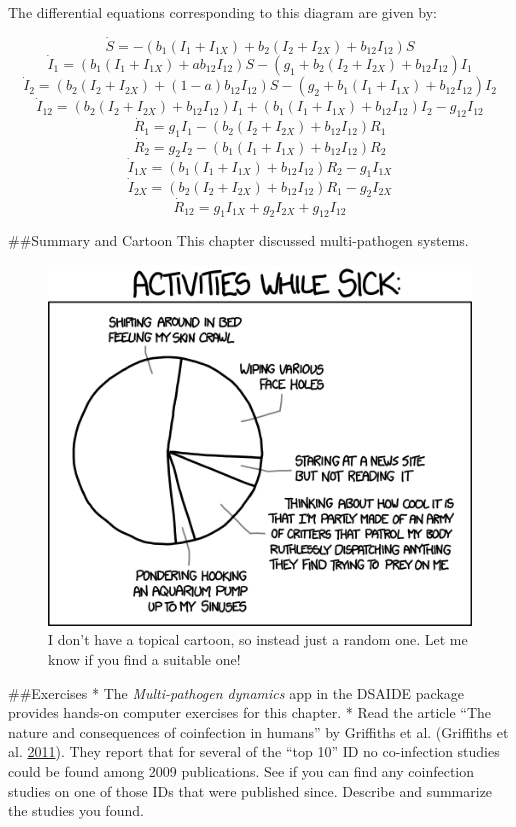 \documentclass[]{book}
\theoremstyle{definition}
\theoremstyle{definition}
\theoremstyle{definition}
\theoremstyle{remark}
\begin{document}
The differential equations corresponding to this diagram are given by:

\[\dot S =  -  (b_{1} (I_1+I_{1X}) + b_{2} (I_2+I_{2X}) + b_{12}I_{12}) S  \]
\[\dot I_1 =   (b_{1} (I_1+I_{1X}) + ab_{12} I_{12})S - (g_1  + b_{2} (I_2+I_{2X})  + b_{12}  I_{12}) I_1\]
\[\dot I_2 =   (b_{2} (I_2+I_{2X}) +  (1-a) b_{12} I_{12})S - (g_2 + b_{1}(I_1 + I_{1X}) + b_{12} I_{12}) I_2\]
\[\dot I_{12} = (b_{2} (I_2+I_{2X})  + b_{12}  I_{12}) I_1 + (b_{1}(I_1 + I_{1X}) + b_{12} I_{12}) I_2  - g_{12} I_{12}\]
\[\dot R_1 = g_1 I_1 - (b_2 (I_2 + I_{2X}) + b_{12}  I_{12}) R_1\]
\[\dot R_2 = g_2 I_2 - (b_1 (I_1 + I_{1X}) + b_{12}  I_{12}) R_2\]
\[\dot I_{1X} = (b_1 (I_1 + I_{1X}) + b_{12}  I_{12}) R_2 - g_{1} I_{1X}\]
\[\dot I_{2X} = (b_2 (I_2 + I_{2X}) + b_{12}  I_{12}) R_1 - g_{2} I_{2X}\]
\[\dot R_{12} = g_{1} I_{1X} + g_{2} I_{2X} + g_{12} I_{12} \]

\#\#Summary and Cartoon This chapter discussed multi-pathogen systems.

\begin{figure}
\centering
\includegraphics{./images/xkcd-sick_day.png}
\caption{I don't have a topical cartoon, so instead just a random one.
Let me know if you find a suitable one!}
\end{figure}

\#\#Exercises * The \emph{Multi-pathogen dynamics} app in the DSAIDE
package provides hands-on computer exercises for this chapter. * Read
the article ``The nature and consequences of coinfection in humans'' by
Griffiths et al. (Griffiths et al.
\protect\hyperlink{ref-griffiths11}{2011}). They report that for several
of the ``top 10'' ID no co-infection studies could be found among 2009
publications. See if you can find any coinfection studies on one of
those IDs that were published since. Describe and summarize the studies
you found.
\end{document}
